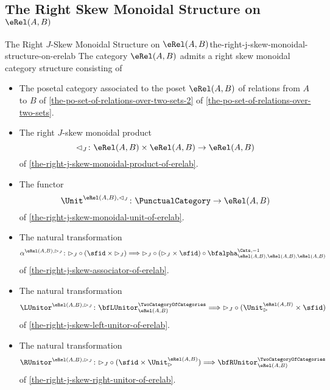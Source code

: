 \subsection{The Right Skew Monoidal Structure on \texorpdfstring{$\eRel(A,B)$}{Rel(A,B)}}\label{subsection-the-right-skew-monoidal-structure-on-rel-a-b}
\begin{proposition}{The Right $J$-Skew Monoidal Structure on $\eRel(A,B)$}{the-right-j-skew-monoidal-structure-on-erelab}%
    The category $\eRel(A,B)$ admits a right skew monoidal category structure consisting of%
    \begin{itemize}
        \item{}The posetal category associated to the poset $\eRel(A,B)$ of relations from $A$ to $B$ of \cref{the-po-set-of-relations-over-two-sets-2} of \cref{the-po-set-of-relations-over-two-sets}.
        \item{}The right $J$-skew monoidal product
            \[
                \lhd_{J}%
                \colon%
                \eRel(A,B)\times\eRel(A,B)%
                \to%
                \eRel(A,B)
            \]%
            of \cref{the-right-j-skew-monoidal-product-of-erelab}.
        \item{}The functor
            \[
                \Unit^{\eRel(A,B),\lhd_{J}}
                \colon
                \PunctualCategory
                \to
                \eRel(A,B)
            \]
            of \cref{the-right-j-skew-monoidal-unit-of-erelab}.
        \item{}The natural transformation
            \begingroup\small
            \[
                \alpha^{\eRel(A,B),\rhd_{J}}%
                \colon%
                {\rhd_{J}}\circ{(\sfid\times{\rhd_{J}})}%
                \Longrightarrow%
                {\rhd_{J}}\circ{({\rhd_{J}}\times\sfid)}\circ{\bfalpha^{\Cats,-1}_{\eRel(A,B),\eRel(A,B),\eRel(A,B)}}%
            \]
            \endgroup
            of \cref{the-right-j-skew-associator-of-erelab}.
        \item{}The natural transformation
            \[
                \LUnitor^{\eRel(A,B),\rhd_{J}}
                \colon
                \bfLUnitor^{\TwoCategoryOfCategories}_{\eRel(A,B)}
                \Longrightarrow
                {\rhd_{J}}\circ{(\Unit^{\eRel(A,B)}_{\rhd}\times\sfid)}
            \]
            of \cref{the-right-j-skew-left-unitor-of-erelab}.
        \item{}The natural transformation
            \[
                \RUnitor^{\eRel(A,B),\rhd_{J}}
                \colon
                {\rhd_{J}}\circ{(\sfid\times\Unit^{\eRel(A,B)}_{\rhd})}
                \Longrightarrow
                \bfRUnitor^{\TwoCategoryOfCategories}_{\eRel(A,B)}
            \]
            of \cref{the-right-j-skew-right-unitor-of-erelab}.
    \end{itemize}
\end{proposition}

